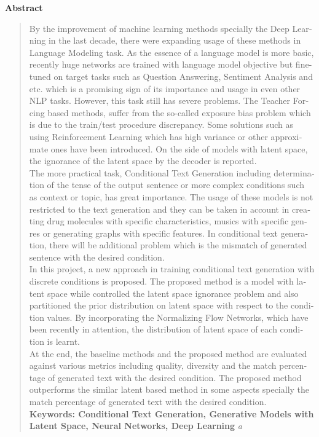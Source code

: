 \thispagestyle{empty} 

\begin{latin}
\centerline{\textbf{\large{Abstract}}}
\begin{quote}
    By the improvement of machine learning methods specially the Deep Learning in the last decade, there were expanding usage of these methods in Language Modeling task. As the essence of a language model is more basic, recently huge networks are trained with language model objective but fine-tuned on target tasks such as Question Answering, Sentiment Analysis and etc.
    which is a promising sign of its importance and usage in even other NLP tasks. However, this task still has severe problems. The Teacher Forcing based methods, suffer from the so-called exposure bias problem which is due to the train/test procedure discrepancy. Some solutions such as using Reinforcement Learning which has high variance or other approximate ones have been introduced. On the side of models with latent space, the ignorance of the latent space by the decoder is reported.
    \\
    The more practical task, Conditional Text Generation including determination of the tense of the output sentence or more complex conditions such as context or topic, has great importance. The usage of these models is not restricted to the text generation and they can be taken in account in creating drug molecules with specific characteristics, musics with specific genres or generating graphs with specific features. In conditional text generation, there will be additional problem which is the mismatch of generated sentence with the desired condition.
    \\
    In this project, a new approach in training conditional text generation with discrete conditions is proposed. The proposed method is a model with latent space while controlled the latent space ignorance problem and also partitioned the prior distribution on latent space with respect to the condition values. By incorporating the Normalizing Flow Networks, which have been recently in attention, the distribution of latent space of each condition is learnt.
    \\
    At the end, the baseline methods and the proposed method are evaluated against various metrics including quality, diversity and the match percentage of generated text with the desired condition. The proposed method outperforms the similar latent based method in some aspects specially the match percentage of generated text with the desired condition.
\vskip 1cm
\textbf{Keywords: Conditional Text Generation, Generative Models with Latent Space, Neural Networks, Deep Learning} \textit{a}
\end{quote}
\end{latin}

